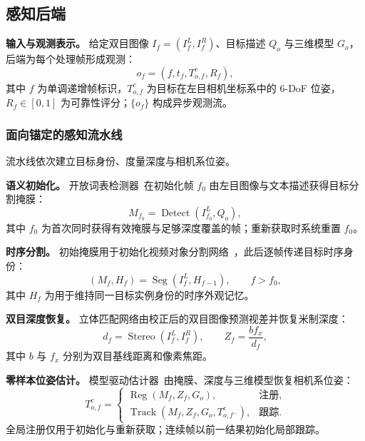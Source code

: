 \documentclass[review]{vgtc}
\begin{document}
\subsection{感知后端}\label{sec:perception}

\textbf{输入与观测表示。}
给定双目图像 $I_f = (I_f^L, I_f^R)$、目标描述 $Q_o$ 与三维模型 $G_o$，后端为每个处理帧形成观测：
\begin{equation}
o_f = (f, t_f, T_{o,f}^{c}, R_f),
\label{eq:observation}
\end{equation}
其中 $f$ 为单调递增帧标识，$T_{o,f}^{c}$ 为目标在左目相机坐标系中的 6-DoF 位姿，$R_f \in [0,1]$ 为可靠性评分；$\{o_f\}$ 构成异步观测流。

\subsubsection{面向锚定的感知流水线}

流水线依次建立目标身份、度量深度与相机系位姿。

\textbf{语义初始化。}
开放词表检测器~\cite{yoloe2025}在初始化帧 $f_0$ 由左目图像与文本描述获得目标分割掩膜：
\begin{equation}
M_{f_0} = \operatorname{Detect}(I_{f_0}^{L}, Q_o),
\label{eq:detect}
\end{equation}
其中 $f_0$ 为首次同时获得有效掩膜与足够深度覆盖的帧；重新获取时系统重置 $f_0$。

\textbf{时序分割。}
初始掩膜用于初始化视频对象分割网络~\cite{cutie2024}，此后逐帧传递目标时序身份：
\begin{equation}
(M_f, H_f) = \operatorname{Seg}(I_f^{L}, H_{f-1}), \qquad f > f_0,
\label{eq:seg}
\end{equation}
其中 $H_f$ 为用于维持同一目标实例身份的时序外观记忆。

\textbf{双目深度恢复。}
立体匹配网络由校正后的双目图像预测视差并恢复米制深度：
\begin{equation}
d_f = \operatorname{Stereo}(I_f^{L}, I_f^{R}), \qquad Z_f = \frac{b f_x}{d_f},
\label{eq:depth}
\end{equation}
其中 $b$ 与 $f_x$ 分别为双目基线距离和像素焦距。

\textbf{零样本位姿估计。}
模型驱动估计器~\cite{foundationpose2024}由掩膜、深度与三维模型恢复相机系位姿：
\begin{equation}
T_{o,f}^{c} =
\begin{cases}
\operatorname{Reg}(M_f, Z_f, G_o), & \text{注册}, \\
\operatorname{Track}(M_f, Z_f, G_o, T_{o,f^-}^{c}), & \text{跟踪}.
\end{cases}
\label{eq:pose}
\end{equation}
全局注册仅用于初始化与重新获取；连续帧以前一结果初始化局部跟踪。
\end{document}
